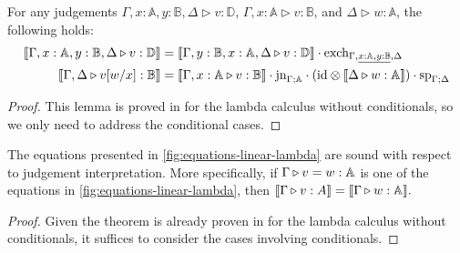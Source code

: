 \begin{lemma} \label{lem:sub_exch}
  For any judgements $\Gamma, x: \mathbb{A}, y: \mathbb{B}, \Delta \triangleright v : \mathbb{D}$, $\Gamma, x: \mathbb{A} \triangleright v: \mathbb{B}$, and $\Delta \triangleright w: \mathbb{A}$, the following holds:
\begin{equation*}
\begin{split}
  \llbracket \Gamma, x: \mathbb{A}, y: \mathbb{B}, \Delta \triangleright v : \mathbb{D} \rrbracket & = \llbracket \Gamma,  y: \mathbb{B}, x: \mathbb{A}, \Delta \triangleright v : \mathbb{D} \rrbracket \cdot \text{exch}_{\Gamma, \underline{x: \mathbb{A}, y: \mathbb{B}}, \Delta}\\
  \llbracket \Gamma,\Delta \triangleright v[w/x]: \mathbb{B} \rrbracket & = \llbracket \Gamma, x: \mathbb{A} \triangleright v: \mathbb{B} \rrbracket \cdot \text{jn}_{\Gamma;\mathbb{A}} \cdot (\mathrm{id} \otimes \llbracket \Delta \triangleright w: \mathbb{A} \rrbracket ) \cdot \text{sp}_{\Gamma; \Delta} 
\end{split}
\end{equation*}
\end{lemma}


\begin{proof}
  This lemma is proved in \cite[Lemma 2.2]{dahlqvist2023syntactic} for the lambda calculus without conditionals, so we only need to address the conditional cases.
\end{proof}




\begin{theorem} \label{thm:soundness_classical}
The equations presented in \autoref{fig:equations-linear-lambda} are sound with respect to judgement interpretation. 
More specifically, if \(\Gamma \triangleright v = w : \mathbb{A}\) is one of the equations in \autoref{fig:equations-linear-lambda}, then 
$\llbracket \Gamma \triangleright v : A  \rrbracket = \llbracket  \Gamma \triangleright w : \mathbb{A}\rrbracket.$
\end{theorem}

\begin{proof}
  Given the theorem is already proven in \cite[Theorem 2.3]{dahlqvist2023syntactic} for the lambda calculus without conditionals, it suffices to consider the cases involving conditionals.
\end{proof}

